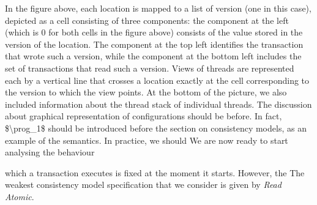 \begin{example}
\begin{center}
\end{center}
In the figure above, each location is mapped to a list of version (one in this case), depicted as a cell 
consisting of three components: the component at  the left (which is $0$ for both cells in the figure 
above) consists of the value stored in the version of the location. The component at the top 
left identifies the transaction that wrote such a version, while the component at the bottom left 
includes the set of transactions that read such a version. Views of threads are represented each by a vertical  
line that crosses a location exactly at the cell corresponding to the version to which the view points. 
At the bottom of the picture, we also included information about the thread stack of individual threads.
\ac{The discussion about graphical representation of configurations should be before.
In fact, $\prog_1$ should be introduced before the section on consistency models, as 
an example of the semantics.} In practice, we should 
We are now ready to start analysing the behaviour 

\end{example}
which a transaction executes is fixed at the moment it starts. However, the 
The weakest consistency model specification that we consider is given by \emph{Read Atomic}. 
